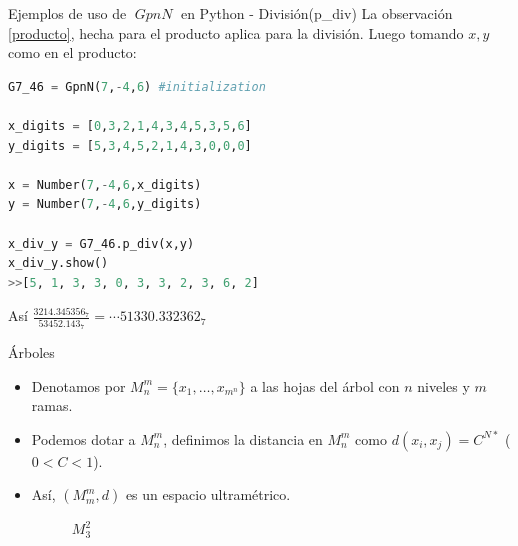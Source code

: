 \documentclass{beamer}
\theoremstyle{definition}
\numberwithin{equation}{section}
\DeclareMathOperator{\gpn}{\mathit{{GpnN}}}
\begin{document}
\begin{frame}[fragile]{Ejemplos de uso de $\gpn$ en Python - División(p\_div) }
La observación \ref{producto}, hecha para el producto aplica para la división. Luego tomando $x,y$ como en el producto:

\begin{lstlisting}[language = Python, caption = división de números en $\mathit{G7\_46}$,basicstyle=\tiny]
G7_46 = GpnN(7,-4,6) #initialization

x_digits = [0,3,2,1,4,3,4,5,3,5,6]
y_digits = [5,3,4,5,2,1,4,3,0,0,0]

x = Number(7,-4,6,x_digits)
y = Number(7,-4,6,y_digits)

x_div_y = G7_46.p_div(x,y)
x_div_y.show()
>>[5, 1, 3, 3, 0, 3, 3, 2, 3, 6, 2]
\end{lstlisting}
Así $\frac{3214.345356_7}{53452.143_7}=\cdots51330.332362_7$
\end{frame}



\begin{frame}[fragile]{Árboles}
\begin{itemize}
	\item Denotamos por $M_n^m=\{x_1, \dots, x_{m^n}\}$ a las hojas del árbol con $n$ niveles y $m$ ramas.
	\item Podemos dotar a $M_n^m$, definimos la distancia en $M_n^m$ como $d   (x_i,x_j)=C^{N*}$ ($0<C<1$).
	\item Así, $   (M_m^m,d)$ es un espacio ultramétrico.
	
		\begin{figure}%
			\centering
			\caption{$M_3^2$}%
		\end{figure}
\end{itemize}	

\end{frame}
\end{document}
